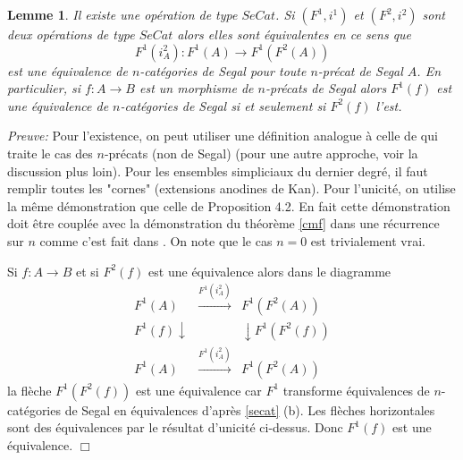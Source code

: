 \documentclass[12pt]{article}
\newcommand{\eop}{\hfill $\Box$\vspace{.1in}}
\newtheorem{lemme}[lemma]{Lemme}
\begin{document}
\begin{lemme}
\label{secatunique}
Il existe une op\'eration de type $SeCat$. Si $(F^1, i^1)$ et $(F^2, i^2)$
sont deux op\'erations de type $SeCat$ alors elles sont \'equivalentes en ce
sens que
$$
F^1(i^2_A): F^1(A) \rightarrow F^1(F^2(A))
$$
est une \'equivalence de $n$-cat\'egories de Segal pour toute $n$-pr\'ecat de
Segal $A$. En particulier, si $f:A\rightarrow B$ est un morphisme  de
$n$-pr\'ecats de Segal alors $F^1(f)$ est une \'equivalence de $n$-cat\'egories
de Segal si et seulement si $F^2(f)$ l'est.
\end{lemme}
{\em Preuve:}
Pour l'existence, on peut utiliser une d\'efinition analogue \`a celle de
\cite{nCAT} qui traite le cas des $n$-pr\'ecats (non de Segal) (pour une
autre approche, voir la discussion
plus loin).
Pour les ensembles
simpliciaux du dernier degr\'e,
il faut remplir toutes les "cornes" (extensions anodines
de Kan). Pour l'unicit\'e, on utilise la m\^eme d\'emonstration que celle de
\cite{nCAT} Proposition 4.2. En fait cette d\'emonstration doit \^etre coupl\'ee
avec la d\'emonstration du th\'eor\`eme \ref{cmf} dans une r\'ecurrence sur $n$
comme c'est fait dans \cite{nCAT}. On note que le cas $n=0$ est trivialement
vrai.

Si $f: A\rightarrow B$ et si $F^2(f)$ est une \'equivalence alors dans le
diagramme
$$
\begin{array}{ccc}
F^1(A) & \stackrel{F^1(i^2_A)}{\rightarrow} &  F^1(F^2(A))\\
{\scriptstyle F^1(f)}\downarrow && \downarrow {\scriptstyle F^1(F^2(f))}\\
F^1(A) & \stackrel{F^1(i^2_A)}{\rightarrow} &  F^1(F^2(A))
\end{array}
$$
la fl\`eche $F^1(F^2(f))$ est une \'equivalence car $F^1$ transforme
\'equivalences de $n$-cat\'egories de Segal en \'equivalences d'apr\`es
\ref{secat} (b). Les fl\`eches horizontales sont des \'equivalences par le
r\'esultat d'unicit\'e ci-dessus. Donc $F^1(f)$ est une \'equivalence.
\eop
\end{document}
